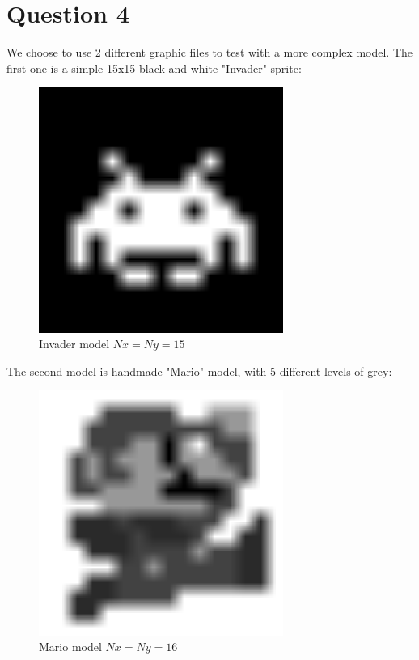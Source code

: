 \documentclass[12pt,a4paper]{extreport}
\begin{document}
\newpage

\section{Question 4}

We choose to use 2 different graphic files to test with a more complex model. 
The first one is a simple 15x15 black and white "Invader" sprite:
\begin{figure}[h]
\begin{center}
\includegraphics[width=8cm]{../invader15x15.png} 
\end{center}
\caption{Invader model $Nx=Ny=15$}
\end{figure}

\newpage

The second model is handmade "Mario" model, with 5 different levels of grey:
\begin{figure}[!h]
\begin{center}
\includegraphics[width=8cm]{../mario16x16.png} 
\end{center}
\caption{Mario model $Nx=Ny=16$}
\end{figure}
\end{document}
